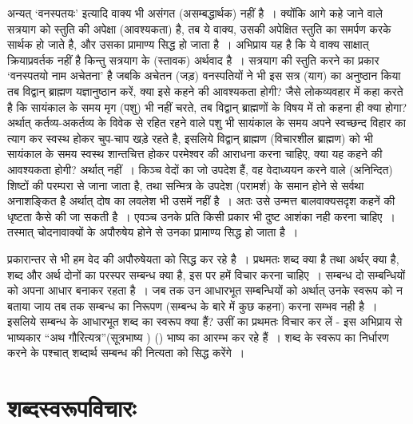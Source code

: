 अन्यत् ‘वनस्पतयः' इत्यादि वाक्य भी असंगत (असम्बद्धार्थक) नहीं है~। क्योंकि आगे कहे जाने वाले सत्रयाग को स्तुति की अपेक्षा (आवश्यकता) है, तब ये वाक्य, उसकी अपेक्षित स्तुति का समर्पण करके सार्थक हो जाते है, और उसका प्रामाण्य सिद्ध हो जाता है~। अभिप्राय यह है कि ये वाक्य साक्षात् क्रियाप्रवर्तक नहीं है किन्तु सत्रयाग के (स्तावक) अर्थवाद है~। सत्रयाग की स्तुति करने का प्रकार ‘वनस्पतयो नाम अचेतना' है जबकि अचेतन (जड़) वनस्पतियों ने भी इस सत्र (याग) का अनुष्ठान किया तब विद्वान् ब्राह्मण यज्ञानुष्ठान करें, क्या इसे कहने की आवश्यकता होगी? जैसे लोकव्यवहार में कहा करते है कि सायंकाल के समय मृग (पशु) भी नहीं चरते, तब विद्वान् ब्राह्मणों के विषय में तो कहना ही क्या होगा? अर्थात् कर्तव्य-अकर्तव्य के विवेक से रहित रहने वाले पशु भी सायंकाल के समय अपने स्वच्छन्द विहार का त्याग कर स्वस्थ होकर चुप-चाप खड़े रहते है, इसलिये विद्वान् ब्राह्मण (विचारशील ब्राह्मण) को भी सायंकाल के समय स्वस्थ शान्तचित्त होकर परमेश्वर की आराधना करना चाहिए, क्या यह कहने की आवश्यकता होगी? अर्थात् नहीं~। किञ्च वेदों का जो उपदेश हैं, वह वेदाध्ययन करने वाले (अनिन्दित) शिष्टों की परम्परा से जाना जाता है, तथा सन्मित्र के उपदेश (परामर्श) के समान होने से सर्वथा अनाशङ्कित है अर्थात् दोष का लवलेश भी उसमें नहीं है~। अतः उसे उन्मत्त बालवाक्यसदृश कहनें की धृष्टता कैसे की जा सकती है~। एवञ्च उनके प्रति किसी प्रकार भी दुष्ट आशंका नही करना चाहिए~। तस्मात् चोदनावाक्यों के अपौरुषेय होने से उनका प्रामाण्य सिद्ध हो जाता है~।

प्रकारान्तर से भी हम वेद की अपौरुषेयता को सिद्ध कर रहे है~। प्रथमतः शब्द क्या है तथा अर्थर् क्या है, शब्द और अर्थ दोनों का परस्पर सम्बन्ध क्या है, इस पर हमें विचार करना चाहिए~। सम्बन्ध दो सम्बन्धियों को अपना आधार बनाकर रहता है~। जब तक उन आधारभूत सम्बन्धियों को अर्थात् उनके स्वरूप को न बताया जाय तब तक सम्बन्ध का निरूपण (सम्बन्ध के बारे में कुछ कहना) करना सम्भव नही है~। इसलिये सम्बन्ध के आधारभूत शब्द का स्वरूप क्या हैं? उसीं का प्रथमतः विचार कर लें - इस अभिप्राय से भाष्यकार “अथ गौरित्यत्र”(सूत्रभाष्य ) () भाष्य का आरम्भ कर रहे हैं~। शब्द के स्वरूप का निर्धारण करने के पश्चात् शब्दार्थ सम्बन्ध की नित्यता को सिद्ध करेंगे~।\\[-.9cm]

\section*{शब्दस्वरूपविचारः}

